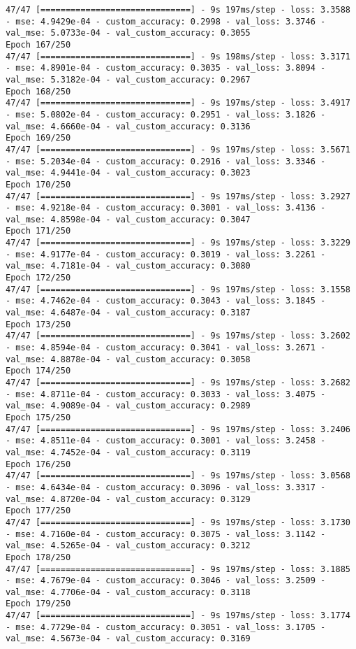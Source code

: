 \begin{lstlisting}
47/47 [==============================] - 9s 197ms/step - loss: 3.3588 - mse: 4.9429e-04 - custom_accuracy: 0.2998 - val_loss: 3.3746 - val_mse: 5.0733e-04 - val_custom_accuracy: 0.3055
Epoch 167/250
47/47 [==============================] - 9s 198ms/step - loss: 3.3171 - mse: 4.8901e-04 - custom_accuracy: 0.3035 - val_loss: 3.8094 - val_mse: 5.3182e-04 - val_custom_accuracy: 0.2967
Epoch 168/250
47/47 [==============================] - 9s 197ms/step - loss: 3.4917 - mse: 5.0802e-04 - custom_accuracy: 0.2951 - val_loss: 3.1826 - val_mse: 4.6660e-04 - val_custom_accuracy: 0.3136
Epoch 169/250
47/47 [==============================] - 9s 197ms/step - loss: 3.5671 - mse: 5.2034e-04 - custom_accuracy: 0.2916 - val_loss: 3.3346 - val_mse: 4.9441e-04 - val_custom_accuracy: 0.3023
Epoch 170/250
47/47 [==============================] - 9s 197ms/step - loss: 3.2927 - mse: 4.9218e-04 - custom_accuracy: 0.3001 - val_loss: 3.4136 - val_mse: 4.8598e-04 - val_custom_accuracy: 0.3047
Epoch 171/250
47/47 [==============================] - 9s 197ms/step - loss: 3.3229 - mse: 4.9177e-04 - custom_accuracy: 0.3019 - val_loss: 3.2261 - val_mse: 4.7181e-04 - val_custom_accuracy: 0.3080
Epoch 172/250
47/47 [==============================] - 9s 197ms/step - loss: 3.1558 - mse: 4.7462e-04 - custom_accuracy: 0.3043 - val_loss: 3.1845 - val_mse: 4.6487e-04 - val_custom_accuracy: 0.3187
Epoch 173/250
47/47 [==============================] - 9s 197ms/step - loss: 3.2602 - mse: 4.8594e-04 - custom_accuracy: 0.3041 - val_loss: 3.2671 - val_mse: 4.8878e-04 - val_custom_accuracy: 0.3058
Epoch 174/250
47/47 [==============================] - 9s 197ms/step - loss: 3.2682 - mse: 4.8711e-04 - custom_accuracy: 0.3033 - val_loss: 3.4075 - val_mse: 4.9089e-04 - val_custom_accuracy: 0.2989
Epoch 175/250
47/47 [==============================] - 9s 197ms/step - loss: 3.2406 - mse: 4.8511e-04 - custom_accuracy: 0.3001 - val_loss: 3.2458 - val_mse: 4.7452e-04 - val_custom_accuracy: 0.3119
Epoch 176/250
47/47 [==============================] - 9s 197ms/step - loss: 3.0568 - mse: 4.6434e-04 - custom_accuracy: 0.3096 - val_loss: 3.3317 - val_mse: 4.8720e-04 - val_custom_accuracy: 0.3129
Epoch 177/250
47/47 [==============================] - 9s 197ms/step - loss: 3.1730 - mse: 4.7160e-04 - custom_accuracy: 0.3075 - val_loss: 3.1142 - val_mse: 4.5265e-04 - val_custom_accuracy: 0.3212
Epoch 178/250
47/47 [==============================] - 9s 197ms/step - loss: 3.1885 - mse: 4.7679e-04 - custom_accuracy: 0.3046 - val_loss: 3.2509 - val_mse: 4.7706e-04 - val_custom_accuracy: 0.3118
Epoch 179/250
47/47 [==============================] - 9s 197ms/step - loss: 3.1774 - mse: 4.7729e-04 - custom_accuracy: 0.3051 - val_loss: 3.1705 - val_mse: 4.5673e-04 - val_custom_accuracy: 0.3169

\end{lstlisting}
